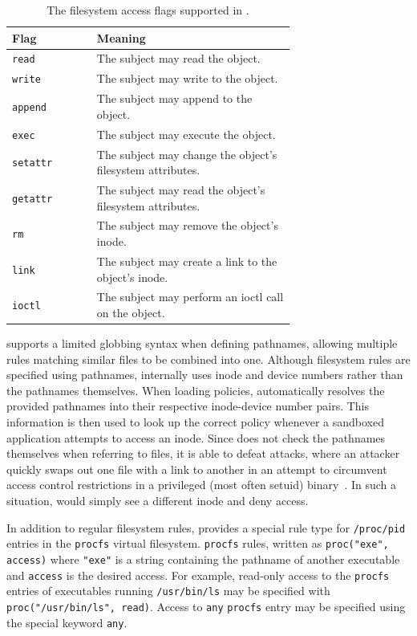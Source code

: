 \begin{table}[htpb]
    \centering
    \caption{The filesystem access flags supported in \bpfbox{}.}
    \label{tab:fs-access}
    \begin{tabular}{lp{0.7\linewidth}}
    \toprule
    Flag & Meaning \\
    \midrule
    \texttt{read}    & The subject may read the object. \\
    \texttt{write}   & The subject may write to the object. \\
    \texttt{append}  & The subject may append to the object. \\
    \texttt{exec}    & The subject may execute the object. \\
    \texttt{setattr} & The subject may change the object's filesystem attributes. \\
    \texttt{getattr} & The subject may read the object's filesystem attributes. \\
    \texttt{rm}      & The subject may remove the object's inode. \\
    \texttt{link}    & The subject may create a link to the object's inode. \\
    \texttt{ioctl}   & The subject may perform an ioctl call on the object. \\
    \bottomrule
    \end{tabular}
\end{table}

\bpfbox{} supports a limited globbing syntax when defining pathnames, allowing multiple
rules matching similar files to be combined into one.  Although filesystem rules are
specified using pathnames, \bpfbox{} internally uses inode and device numbers rather than
the pathnames themselves. When loading policies, \bpfbox{} automatically resolves the
provided pathnames into their respective inode-device number pairs. This information is
then used to look up the correct policy whenever a sandboxed application attempts to
access an inode.  Since \bpfbox{} does not check the pathnames themselves when referring
to files, it is able to defeat  attacks, where an
attacker quickly swaps out one file with a link to another in an attempt to circumvent
access control restrictions in a privileged (most often setuid)
binary~\cite{bishop1996_checking}.  In such a situation, \bpfbox{} would simply see
a different inode and deny access.

In addition to regular filesystem rules, \bpfbox{} provides a special rule type for
\texttt{/proc/pid} entries in the \texttt{procfs} virtual filesystem. \texttt{procfs}
rules, written as \lstinline[language=bpfbox]{proc("exe", access)} where
\lstinline[language=bpfbox]{"exe"} is a string containing the pathname of another
executable and \lstinline[language=bpfbox]{access} is the desired access. For example,
read-only access to the \texttt{procfs} entries of executables running
\texttt{/usr/bin/ls} may be specified with \lstinline[language=bpfbox]{proc("/usr/bin/ls", read)}.
Access to \lstinline[language=bpfbox]{any} \texttt{procfs} entry may be specified
using the special keyword \lstinline[language=bpfbox]{any}.



